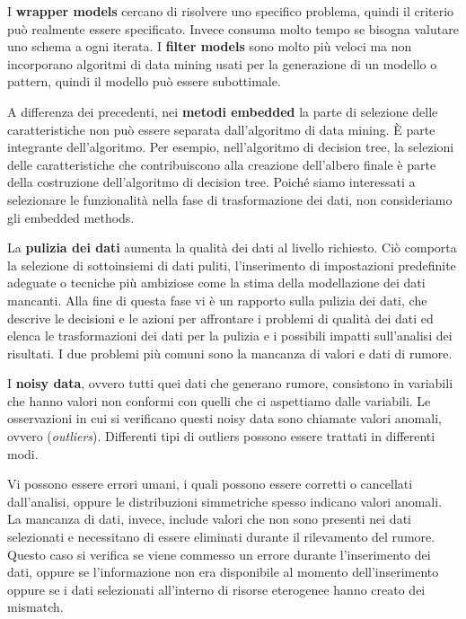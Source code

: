 \documentclass[a4paper]{extarticle}
\begin{document}
I \textbf{wrapper models} cercano di risolvere uno specifico problema, quindi il criterio può realmente essere specificato. Invece consuma molto tempo se bisogna valutare uno schema a ogni iterata. I \textbf{filter models} sono molto più veloci  ma non incorporano algoritmi di data mining usati per la generazione di un modello o pattern, quindi il modello può essere subottimale.

A differenza dei precedenti, nei \textbf{metodi embedded} la parte di selezione delle caratteristiche non può essere separata dall'algoritmo di data mining. È parte integrante dell'algoritmo. Per esempio, nell'algoritmo di decision tree, la selezioni delle caratteristiche che contribuiscono alla creazione dell'albero finale è parte della costruzione dell'algoritmo di decision tree. Poiché siamo interessati a selezionare le funzionalità nella fase di trasformazione dei dati, non consideriamo gli embedded methods.

La \textbf{pulizia dei dati} aumenta la qualità dei dati al livello richiesto. Ciò comporta la selezione di sottoinsiemi di dati puliti, l'inserimento di impostazioni predefinite adeguate o tecniche più ambiziose come la stima della modellazione dei dati mancanti. Alla fine di questa fase vi è un rapporto sulla pulizia dei dati, che descrive le decisioni e le azioni per affrontare i problemi di qualità dei dati ed elenca le trasformazioni dei dati per la pulizia e i possibili impatti sull'analisi dei risultati. I due problemi più comuni sono la mancanza di valori e dati di rumore. 

I \textbf{noisy data}, ovvero tutti quei dati che generano rumore, consistono in variabili che hanno valori non conformi con quelli che ci aspettiamo dalle variabili. Le osservazioni in cui si verificano questi noisy data sono chiamate valori anomali, ovvero (\textit{outliers}). Differenti tipi di outliers possono essere trattati in differenti modi. 

Vi possono essere errori umani, i quali possono essere corretti o cancellati dall'analisi, oppure le distribuzioni simmetriche spesso indicano valori anomali. La mancanza di dati, invece, include valori che non sono presenti nei dati selezionati e necessitano di essere eliminati durante il rilevamento del rumore. Questo caso si verifica se viene commesso un errore durante l'inserimento dei dati, oppure se l'informazione non era disponibile al momento dell'inserimento oppure se i dati selezionati all'interno di risorse eterogenee hanno creato dei mismatch. 
\end{document}
